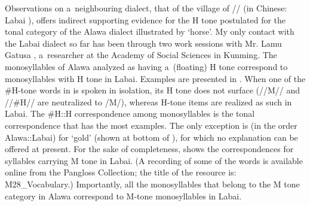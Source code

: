 Observations on a~neighbouring dialect, that of the village of // (in Chinese: Labai ), offers indirect supporting evidence for the H tone postulated for the tonal
category of the Alawa dialect illustrated by ‘horse’. My only contact with the Labai dialect so far has been through two
work sessions with Mr. Lamu Gatusa , a~researcher at the Academy of Social Sciences in Kunming. The monosyllables of Alawa analyzed as having a~(floating) H tone correspond to monosyllables
with H tone in Labai. Examples are presented in . When one of the \#H-tone words in  is spoken in isolation, its H tone does not surface (\mbox{//M//} and \mbox{\mbox{//\#H//}} are neutralized to /M/), whereas H-tone items are realized as such in Labai. The \#H::H correspondence among monosyllables is the tonal correspondence that has the most
examples. The only exception is (in the order Alawa::Labai) 
for ‘gold’ (shown at bottom of ), for which no explanation can be offered at present. For the sake of completeness,  shows the correspondences for syllables carrying M tone in Labai. (A
recording of some of the words is available online from the Pangloss Collection; the title of the
resource is: M28\_Vocabulary.) Importantly, all the monosyllables that belong to the M tone category in
Alawa correspond to M-tone monosyllables in Labai. 

